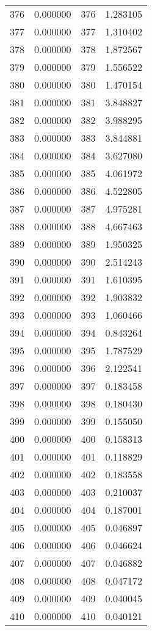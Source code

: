 \documentclass[12pt]{article}
\begin{document}
\begin{longtable}{@{}cccc@{}}
376 & 0.000000 & 376 & 1.283105 \\
377 & 0.000000 & 377 & 1.310402 \\
378 & 0.000000 & 378 & 1.872567 \\
379 & 0.000000 & 379 & 1.556522 \\
380 & 0.000000 & 380 & 1.470154 \\
381 & 0.000000 & 381 & 3.848827 \\
382 & 0.000000 & 382 & 3.988295 \\
383 & 0.000000 & 383 & 3.844881 \\
384 & 0.000000 & 384 & 3.627080 \\
385 & 0.000000 & 385 & 4.061972 \\
386 & 0.000000 & 386 & 4.522805 \\
387 & 0.000000 & 387 & 4.975281 \\
388 & 0.000000 & 388 & 4.667463 \\
389 & 0.000000 & 389 & 1.950325 \\
390 & 0.000000 & 390 & 2.514243 \\
391 & 0.000000 & 391 & 1.610395 \\
392 & 0.000000 & 392 & 1.903832 \\
393 & 0.000000 & 393 & 1.060466 \\
394 & 0.000000 & 394 & 0.843264 \\
395 & 0.000000 & 395 & 1.787529 \\
396 & 0.000000 & 396 & 2.122541 \\
397 & 0.000000 & 397 & 0.183458 \\
398 & 0.000000 & 398 & 0.180430 \\
399 & 0.000000 & 399 & 0.155050 \\
400 & 0.000000 & 400 & 0.158313 \\
401 & 0.000000 & 401 & 0.118829 \\
402 & 0.000000 & 402 & 0.183558 \\
403 & 0.000000 & 403 & 0.210037 \\
404 & 0.000000 & 404 & 0.187001 \\
405 & 0.000000 & 405 & 0.046897 \\
406 & 0.000000 & 406 & 0.046624 \\
407 & 0.000000 & 407 & 0.046882 \\
408 & 0.000000 & 408 & 0.047172 \\
409 & 0.000000 & 409 & 0.040045 \\
410 & 0.000000 & 410 & 0.040121 \\

\end{longtable}
\end{document}
